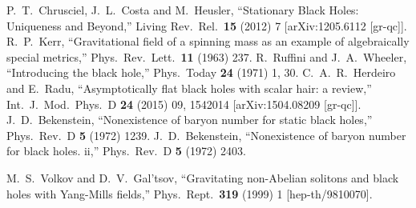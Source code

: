 \documentclass{article}
\numberwithin{equation}{section}
\begin{document}
\begin{small}
\begin{thebibliography}{99}
  P.~T.~Chrusciel, J.~L.~Costa and M.~Heusler,
  ``Stationary Black Holes: Uniqueness and Beyond,''
  Living Rev.\ Rel.\  {\bf 15} (2012) 7
  [arXiv:1205.6112 [gr-qc]].
  R.~P.~Kerr,
  ``Gravitational field of a spinning mass as an example of algebraically special metrics,''
  Phys.\ Rev.\ Lett.\  {\bf 11} (1963) 237.
  R.~Ruffini and J.~A.~Wheeler,
  ``Introducing the black hole,''
  Phys.\ Today {\bf 24} (1971) 1,  30.
  C.~A.~R.~Herdeiro and E.~Radu,
  ``Asymptotically flat black holes with scalar hair: a review,''
  Int.\ J.\ Mod.\ Phys.\ D {\bf 24} (2015) 09,  1542014
  [arXiv:1504.08209 [gr-qc]].
  J.~D.~Bekenstein,
  ``Nonexistence of baryon number for static black holes,''
  Phys.\ Rev.\ D {\bf 5} (1972) 1239.
  J.~D.~Bekenstein,
  ``Nonexistence of baryon number for black holes. ii,''
  Phys.\ Rev.\ D {\bf 5} (1972) 2403.
  
  M.~S.~Volkov and D.~V.~Gal'tsov,
  ``Gravitating non-Abelian solitons and black holes with Yang-Mills fields,''
  Phys.\ Rept.\  {\bf 319} (1999) 1
  [hep-th/9810070].


\end{thebibliography}
\end{small}
\end{document}
